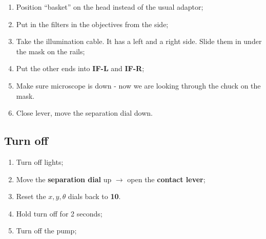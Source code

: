 \begin{enumerate}
  \item Position ``basket'' on the head instead of the usual adaptor;
  \item Put in the filters in the objectives from the side;
  \item Take the illumination cable. It has a left and a right side. Slide them
        in under the mask on the rails;
  \item Put the other ends into \textbf{IF-L} and \textbf{IF-R};
  \item Make sure microscope is down - now we are looking through the chuck on
        the mask.
  \item Close lever, move the separation dial down.
\end{enumerate}

\subsection{Turn off}
\label{sec:turn}

\begin{enumerate}
  \item Turn off lights;
  \item Move the \textbf{separation dial} up $\rightarrow$ open the \textbf{contact
    lever};
  \item Reset the $x, y, \theta$ dials back to \textbf{10}.
  \item Hold turn off for 2 seconds;
  \item Turn off the pump;
\end{enumerate}

